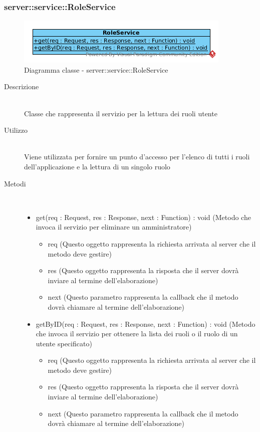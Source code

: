 \vspace{0.5cm}
\hypertarget{server::service::RoleService}{}
\subsubsection[RoleService]{server::service::RoleService}
\begin{center}
			\begin{figure}[H]
				\centering \includegraphics[scale=4, max width=\textwidth, max height=\myheight]{../img/diagrammiClassi/server/service/RoleService.png}
				\caption{Diagramma classe - server::service::RoleService}
			\end{figure}
		\end{center}\begin{description}
\item[Descrizione] \hfill \\
 Classe che rappresenta il servizio per la lettura dei ruoli utente
\item[Utilizzo] \hfill \\
 Viene utilizzata per fornire un punto d'accesso per l'elenco di tutti i ruoli dell'applicazione e la lettura di un singolo ruolo
\item[Metodi] \hfill \\
 \vspace{-7mm}
\begin{itemize}
\item get(req : Request, res : Response, next : Function) : void (Metodo che invoca il servizio per eliminare un amministratore)\begin{itemize}
\item req (Questo oggetto rappresenta la richiesta arrivata al server che il metodo deve gestire)
\item res (Questo oggetto rappresenta la risposta che il server dovrà inviare al termine dell'elaborazione)
\item next (Questo parametro rappresenta la callback che il metodo dovrà chiamare al termine dell’elaborazione)
\end{itemize}

\item getByID(req : Request, res : Response, next : Function) : void (Metodo che invoca il servizio per ottenere la lista dei ruoli o il ruolo di un utente specificato)\begin{itemize}
\item req (Questo oggetto rappresenta la richiesta arrivata al server che il metodo deve gestire)
\item res (Questo oggetto rappresenta la risposta che il server dovrà inviare al termine dell'elaborazione)
\item next (Questo parametro rappresenta la callback che il metodo dovrà chiamare al termine dell’elaborazione)
\end{itemize}


\end{itemize}
\end{description}
